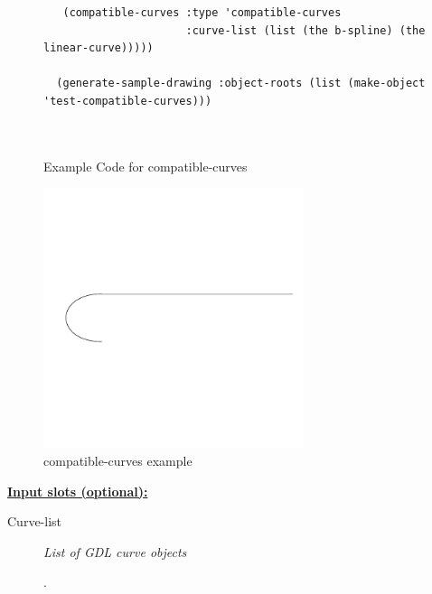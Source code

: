 \documentclass [11pt]{book}
\begin{document}
\begin{itemize}
\begin{figure}
\begin{lrbox}{\boxedverb}
\begin{minipage}{\linewidth}
{\begin{verbatim}
   (compatible-curves :type 'compatible-curves
                      :curve-list (list (the b-spline) (the linear-curve)))))

  (generate-sample-drawing :object-roots (list (make-object 'test-compatible-curves)))



\end{verbatim}}
\end{minipage}
\end{lrbox}
\fbox{\usebox{\boxedverb}}

\caption{Example Code for compatible-curves}

\label{fig:example-code-compatible-curves}

\end{figure}

\begin{figure}
\begin{center}
\includegraphics[width=3in,height=3in]{../images/example-compatible-curves.pdf}
\end{center}

\caption{compatible-curves example}

\label{fig:compatible-curves}

\end{figure}





\textbf{
\underline{Input slots (optional):}}

\begin{description}

\item [Curve-list]
\emph{List of GDL curve objects}

.





\end{description}
\end{itemize}
\end{document}
